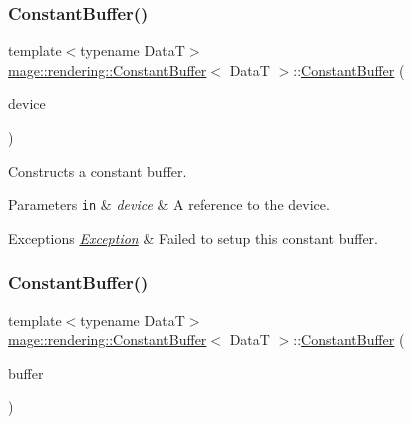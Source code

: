 \subsubsection{\texorpdfstring{Constant\+Buffer()}{ConstantBuffer()}\hspace{0.1cm}{\footnotesize\ttfamily [1/3]}}
{\footnotesize\ttfamily template$<$typename DataT$>$ \\
\hyperlink{classmage_1_1rendering_1_1_constant_buffer}{mage\+::rendering\+::\+Constant\+Buffer}$<$ DataT $>$\+::\hyperlink{classmage_1_1rendering_1_1_constant_buffer}{Constant\+Buffer} (\begin{DoxyParamCaption}\item[{I\+D3\+D11\+Device \&}]{device }\end{DoxyParamCaption})\hspace{0.3cm}{\ttfamily [explicit]}}

Constructs a constant buffer.


\begin{DoxyParams}[1]{Parameters}
\mbox{\tt in}  & {\em device} & A reference to the device. \\
\hline
\end{DoxyParams}

\begin{DoxyExceptions}{Exceptions}
{\em \hyperlink{classmage_1_1_exception}{Exception}} & Failed to setup this constant buffer. \\
\hline
\end{DoxyExceptions}
\hypertarget{classmage_1_1rendering_1_1_constant_buffer_a85af57c527713b8d877524d9f6ce4587}{}\label{classmage_1_1rendering_1_1_constant_buffer_a85af57c527713b8d877524d9f6ce4587} 
\subsubsection{\texorpdfstring{Constant\+Buffer()}{ConstantBuffer()}\hspace{0.1cm}{\footnotesize\ttfamily [2/3]}}
{\footnotesize\ttfamily template$<$typename DataT$>$ \\
\hyperlink{classmage_1_1rendering_1_1_constant_buffer}{mage\+::rendering\+::\+Constant\+Buffer}$<$ DataT $>$\+::\hyperlink{classmage_1_1rendering_1_1_constant_buffer}{Constant\+Buffer} (\begin{DoxyParamCaption}\item[{const \hyperlink{classmage_1_1rendering_1_1_constant_buffer}{Constant\+Buffer}$<$ DataT $>$ \&}]{buffer }\end{DoxyParamCaption})\hspace{0.3cm}{\ttfamily [delete]}}

